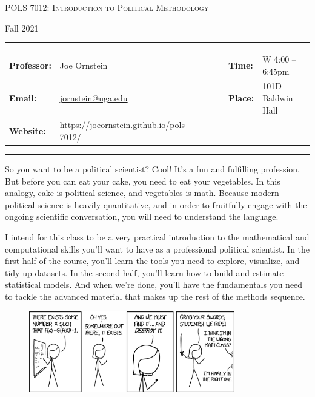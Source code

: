 \documentclass[11pt, letterpaper]{article}
\begin{document}
\begin{center}
{\Large \textsc{POLS 7012: Introduction to Political Methodology}}
\end{center}
\begin{center}
{\large Fall 2021}
\end{center}

\begin{center}
\rule{6.5in}{0.4pt}
\begin{minipage}[t]{.96\textwidth}
\begin{tabular}{llcccll}
\textbf{Professor:} & Joe Ornstein & & &  & \textbf{Time:} & W 4:00 -- 6:45pm \\
\textbf{Email:} &  \href{mailto:jornstein@uga.edu}{jornstein@uga.edu} & & & & \textbf{Place:} & 101D Baldwin Hall\\
\textbf{Website:} & \href{https://joeornstein.github.io/pols-7012/}{https://joeornstein.github.io/pols-7012/} & & & & &
\end{tabular}
\end{minipage}
\rule{6.5in}{0.4pt}
\end{center}
\vspace{.15cm}
\setlength{\unitlength}{1in}
\renewcommand{\arraystretch}{2}


\noindent So you want to be a political scientist? Cool! It's a fun and fulfilling profession. But before you can eat your cake, you need to eat your vegetables. In this analogy, cake is political science, and vegetables is math. Because modern political science is heavily quantitative, and in order to fruitfully engage with the ongoing scientific conversation, you will need to understand the language. 

I intend for this class to be a very practical introduction to the mathematical and computational skills you'll want to have as a professional political scientist. In the first half of the course, you'll learn the tools you need to explore, visualize, and tidy up datasets. In the second half, you'll learn how to build and estimate statistical models. And when we're done, you'll have the fundamentals you need to tackle the advanced material that makes up the rest of the methods sequence. 

\begin{figure}[h]
	\centering
	\href{https://xkcd.com/1856/}{\includegraphics[width=0.8\textwidth]{img/existence_proof_2x.png}}
\end{figure}
\end{document}
